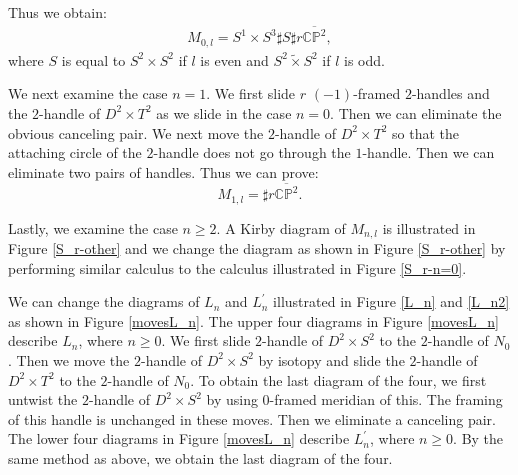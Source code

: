 \documentclass{amsart}
\theoremstyle{plain}
\theoremstyle{definition}
\begin{document}
Thus we obtain: 
\begin{align*}
M_{0,l}=S^1\times S^3\sharp S\sharp r\overline{\mathbb{CP}^2}, 
\end{align*}
where $S$ is equal to $S^2\times S^2$ if $l$ is even and $S^2\tilde{\times} S^2$ if $l$ is odd. 

\par

We next examine the case $n=1$. 
We first slide $r$ $(-1)$-framed $2$-handles and the $2$-handle of $D^2\times T^2$ as we slide in the case $n=0$. 
Then we can eliminate the obvious canceling pair. 
We next move the $2$-handle of $D^2\times T^2$ so that the attaching circle of the $2$-handle does not go through the $1$-handle. 
Then we can eliminate two pairs of handles. 
Thus we can prove: 
\[
M_{1,l}=\sharp r\overline{\mathbb{CP}^2}. 
\]

\par

Lastly, we examine the case $n\geq 2$. 
A Kirby diagram of $M_{n,l}$ is illustrated in Figure \ref{S_r-other} and 
we change the diagram as shown in Figure \ref{S_r-other} by performing similar calculus to the calculus illustrated in Figure \ref{S_r-n=0}. 

We can change the diagrams of $L_n$ and $L_n^\prime$ illustrated in Figure \ref{L_n} and \ref{L_n2} as shown in Figure \ref{movesL_n}. 
The upper four diagrams in Figure \ref{movesL_n} describe $L_n$, where $n\geq 0$. 
We first slide $2$-handle of $D^2\times S^2$ to the $2$-handle of $N_0$. 
Then we move the $2$-handle of $D^2\times S^2$ by isotopy and slide the $2$-handle of $D^2\times T^2$ to the $2$-handle of $N_0$. 
To obtain the last diagram of the four, we first untwist the $2$-handle of $D^2\times S^2$ by using $0$-framed meridian of this. 
The framing of this handle is unchanged in these moves. 
Then we eliminate a canceling pair. 
The lower four diagrams in Figure \ref{movesL_n} describe $L_n^\prime$, where $n\geq 0$. 
By the same method as above, we obtain the last diagram of the four. 
\end{document}
